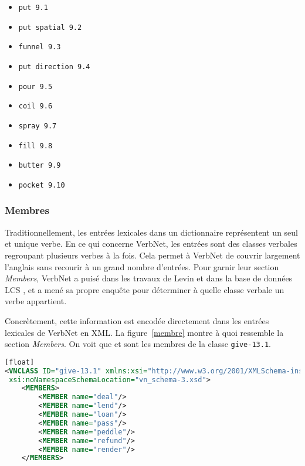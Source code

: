 \begin{itemize}
  \item \texttt{put 9.1}
	\item \texttt{put spatial 9.2}
	\item \texttt{funnel 9.3}
	\item \texttt{put direction 9.4}
	\item \texttt{pour 9.5}
	\item \texttt{coil 9.6}
	\item \texttt{spray 9.7}
	\item \texttt{fill 9.8}
	\item \texttt{butter 9.9}
	\item \texttt{pocket 9.10}
\end{itemize}

\subsubsection{Membres}
Traditionnellement, les entrées lexicales dans un dictionnaire représentent un seul et unique verbe. En ce qui concerne VerbNet, les entrées sont des classes verbales regroupant  plusieurs verbes à la fois. Cela permet à VerbNet de couvrir largement l'anglais sans recourir à un grand nombre d'entrées. Pour garnir leur section \emph{Members}, VerbNet a puisé dans les travaux de Levin \cite{verb-classes.levin.1993} et dans la base de données LCS \citep{AyanGeneratingParsingLexicon2002a}, et a mené sa propre enquête pour déterminer à quelle classe verbale un verbe appartient.

Concrètement, cette information est encodée directement dans les entrées lexicales de VerbNet en XML. La figure~\ref{membre} montre à quoi ressemble la section \emph{Members}. On voit que  et  sont les membres de la classe \texttt{give-13.1}.


\begin{lstlisting}[language=XML, caption = Les membres d'une classe, label=membre][float]
<VNCLASS ID="give-13.1" xmlns:xsi="http://www.w3.org/2001/XMLSchema-instance"
 xsi:noNamespaceSchemaLocation="vn_schema-3.xsd">
    <MEMBERS>
        <MEMBER name="deal"/>
        <MEMBER name="lend"/>
        <MEMBER name="loan"/>
        <MEMBER name="pass"/>
        <MEMBER name="peddle"/>
        <MEMBER name="refund"/>
        <MEMBER name="render"/>
    </MEMBERS>
\end{lstlisting}


